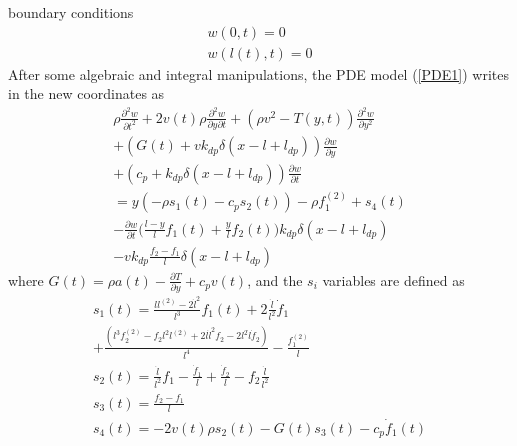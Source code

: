 \documentclass[letterpaper, 11 pt, conference]{ieeeconf}
\begin{document}
boundary conditions
\begin{equation}\label{BC2}
\begin{array}{l}
w(0,t)=0\\
w(l(t),t)=0
\end{array}
\end{equation}
After some algebraic and integral manipulations, the PDE model
(\ref{PDE1}) writes in the new coordinates as
\begin{equation}\label{PDE3}
\begin{array}{c}
\rho\frac{\partial ^2 w}{\partial t^2}+2v(t)\rho\frac{\partial^2
w}{\partial y\partial t}+\left(\rho
v^2-T(y,t)\right)\frac{\partial^2 w}{\partial
y^2}\\+(G(t)+vk_{dp}\delta(x-l+l_{dp}))\frac{\partial w}{\partial
y}\\+(c_{p}+k_{dp}\delta(x-l+l_{dp}))\frac{\partial w}{\partial
t}\\=y\left(-\rho s_{1}(t)-c_{p} s_{2}(t)\right)-\rho
f^{(2)}_{1}+s_{4}(t)\\-\frac{\partial w}{\partial
t}\big(\frac{l-y}{l}f_{1}(t)+\frac{y}{l}f_{2}(t)\big)k_{dp}\delta(x-l+l_{dp})\\-vk_{dp}\frac{f_{2}-f_{1}}{l}\delta(x-l+l_{dp})
\end{array}
\end{equation}
where $ G(t)=\rho a(t)-\frac{\partial T}{\partial y}+c_{p} v(t)$,
and the $s_{i}$ variables are defined as
\begin{equation}\label{S_i}
\begin{array}{l}
s_{1}(t)=\frac{ll^{(2)}-2\dot{l}^{2}}{l^{3}}f_{1}(t)+2\frac{\dot{l}}{l^{2}}\dot{f}_{1}\\+\frac{(l^{3}f^{(2)}_{2}-f_{2}l^{2}l^{(2)}+2l\dot{l}^{2}f_{2}-2l^{2}\dot{l}\dot{f}_{2})}{l^4}-\frac{f^{(2)}_{1}}{l}\\
s_{2}(t)=\frac{\dot{l}}{l^{2}}f_{1}-\frac{\dot{f}_{1}}{l}+\frac{\dot{f}_{2}}{l}-f_{2}\frac{\dot{l}}{l^{2}}\\
s_{3}(t)=\frac{f_{2}-f_{1}}{l}\\
s_{4}(t)=-2 v(t)\rho s_{2}(t)-G(t)s_{3}(t)-c_{p}\dot{f}_{1}(t)
\end{array}
\end{equation}
\end{document}
